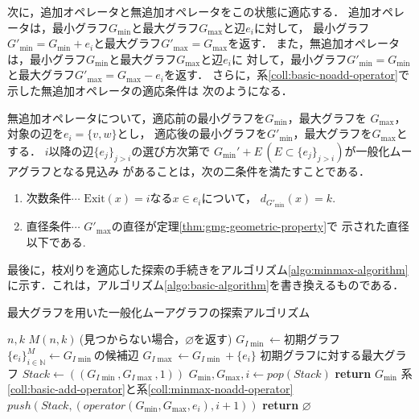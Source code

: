 次に，追加オペレータと無追加オペレータをこの状態に適応する．
追加オペレータは，最小グラフ$G_{\min}$と最大グラフ$G_{\max}$と辺$e_i$に対して，
最小グラフ$G'_{\min}=G_{\min}+e_i$と最大グラフ$G'_{\max}=G_{\max}$を返す．
また，無追加オペレータは，最小グラフ$G_{\min}$と最大グラフ$G_{\max}$と辺$e_i$に
対して，最小グラフ$G'_{\min}=G_{\min}$と最大グラフ$G'_{\max}=G_{\max}-e_i$を返す．
さらに，系\ref{coll:basic-noadd-operator}で示した無追加オペレータの適応条件は
次のようになる．
\begin{collary-without-proof}
  \label{coll:minmax-noadd-operator}
  無追加オペレータについて，適応前の最小グラフを$G_{\min}$，最大グラフを
  $G_{\max}$，対象の辺を$e_i=\{v,w\}$とし，
  適応後の最小グラフを$G'_{\min}$，最大グラフを$G_{\max}$とする．
  $i$以降の辺$\{e_j\}_{j>i}$の選び方次第で
  $G_{\min}'+E\,(E\subset \{e_j\}_{j>i})$が一般化ムーアグラフとなる見込み
  があることは，次の二条件を満たすことである．
  \begin{enumerate}
  \item 次数条件$\cdots$ $\text{Exit}(x)=i$なる$x\in e_i$について，
    $d_{G'_{\min}}(x)=k$.
  \item 直径条件$\cdots$ $G'_{\max}$の直径が定理\ref{thm:gmg-geometric-property}で
    示された直径以下である.
  \end{enumerate}
\end{collary-without-proof}

最後に，枝刈りを適応した探索の手続きをアルゴリズム\ref{algo:minmax-algorithm}
に示す．これは，アルゴリズム\ref{algo:basic-algorithm}を書き換えるものである．
\begin{algorithm}[H]
  \caption{最大グラフを用いた一般化ムーアグラフの探索アルゴリズム}
  \label{algo:minmax-algorithm}
  \begin{algorithmic}[1]
    \Require $n,k$
    \Ensure $M(n,k)\:$(見つからない場合，$\varnothing$を返す)
    \State $G_{I\min}\gets\text{初期グラフ}$
    \State $\{e_i\}_{i\in\mathbb{N}}^M\gets G_{I\min}\text{の候補辺}$
    \State $G_{I\max}\gets G_{I\min}+\{e_i\}$
    \Comment 初期グラフに対する最大グラフ
    \State $Stack\gets((G_{I\min},G_{I\max},1))$
    \State $G_{\min},G_{\max},i\gets pop(Stack)$
    \State \textbf{return} $G_{\min}$
    \EndIf
    \Comment 系\ref{coll:basic-add-operator}と系\ref{coll:minmax-noadd-operator}
    \State $push(Stack,(operator(G_{\min},G_{\max},e_i),i+1))$
    \EndIf
    \EndFor
    \EndWhile
    \State \textbf{return} $\varnothing$
    \EndProcedure
  \end{algorithmic}
\end{algorithm}


